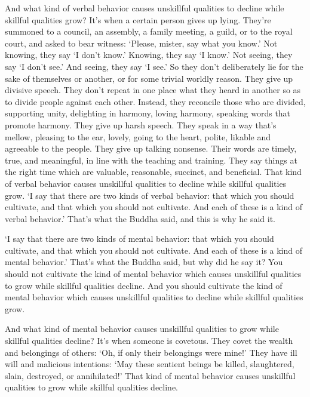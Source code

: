 \documentclass[12pt,openany]{book}%
\begin{document}
And what kind of verbal behavior causes unskillful qualities to decline while skillful qualities grow? It’s when a certain person gives up lying. They’re summoned to a council, an assembly, a family meeting, a guild, or to the royal court, and asked to bear witness: ‘Please, mister, say what you know.’ Not knowing, they say ‘I don’t know.’ Knowing, they say ‘I know.’ Not seeing, they say ‘I don’t see.’ And seeing, they say ‘I see.’ So they don’t deliberately lie for the sake of themselves or another, or for some trivial worldly reason. They give up divisive speech. They don’t repeat in one place what they heard in another so as to divide people against each other. Instead, they reconcile those who are divided, supporting unity, delighting in harmony, loving harmony, speaking words that promote harmony. They give up harsh speech. They speak in a way that’s mellow, pleasing to the ear, lovely, going to the heart, polite, likable and agreeable to the people. They give up talking nonsense. Their words are timely, true, and meaningful, in line with the teaching and training. They say things at the right time which are valuable, reasonable, succinct, and beneficial. That kind of verbal behavior causes unskillful qualities to decline while skillful qualities grow. ‘I say that there are two kinds of verbal behavior: that which you should cultivate, and that which you should not cultivate. And each of these is a kind of verbal behavior.’ That’s what the Buddha said, and this is why he said it. 

‘I say that there are two kinds of mental behavior: that which you should cultivate, and that which you should not cultivate. And each of these is a kind of mental behavior.’ That’s what the Buddha said, but why did he say it? You should not cultivate the kind of mental behavior which causes unskillful qualities to grow while skillful qualities decline. And you should cultivate the kind of mental behavior which causes unskillful qualities to decline while skillful qualities grow. 

And what kind of mental behavior causes unskillful qualities to grow while skillful qualities decline? It’s when someone is covetous. They covet the wealth and belongings of others: ‘Oh, if only their belongings were mine!’ They have ill will and malicious intentions: ‘May these sentient beings be killed, slaughtered, slain, destroyed, or annihilated!’ That kind of mental behavior causes unskillful qualities to grow while skillful qualities decline. 
\end{document}
